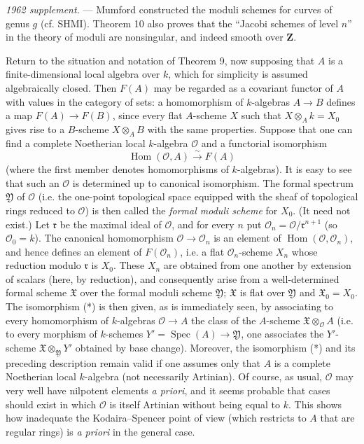 \emph{1962 supplement.} --- Mumford constructed the moduli schemes for curves
of genus $g$ (cf. SHMI). Theorem 10 also proves that the “Jacobi schemes of
level $n$” in the theory of moduli are nonsingular, and indeed smooth over
$\mathbf Z$.

Return to the situation and notation of Theorem 9, now supposing that $A$ is a
finite-dimensional local algebra over $k$, which for simplicity is assumed
algebraically closed. Then $F(A)$ may be regarded as a covariant functor of
$A$ with values in the category of sets: a homomorphism of $k$-algebras
$A\longrightarrow B$ defines a map $F(A)\longrightarrow F(B)$, since every
flat $A$-scheme $X$ such that $X\otimes_A k=X_0$ gives rise to a $B$-scheme
$X\otimes_A B$ with the same properties. Suppose that one can find a complete
Noetherian local $k$-algebra $\mathcal O$ and a functorial isomorphism
\begin{equation}
  \tag{*}
  \operatorname{Hom}(\mathcal O,A)\xrightarrow{\sim}F(A)
\end{equation}
(where the first member denotes homomorphisms of $k$-algebras). It is easy to
see that such an $\mathcal O$ is determined up to canonical isomorphism. The
formal spectrum $\mathfrak Y$ of $\mathcal O$ (i.e. the one-point topological
space equipped with the sheaf of topological rings reduced to $\mathcal O$)
is then called the \emph{formal moduli scheme} for $X_0$. (It need not exist.)
Let $\mathfrak r$ be the maximal ideal of $\mathcal O$, and for every $n$ put
$\mathcal O_n=\mathcal O/\mathfrak r^{n+1}$ (so $\mathcal O_0=k$). The
canonical homomorphism $\mathcal O\longrightarrow\mathcal O_n$ is an element
of $\operatorname{Hom}(\mathcal O,\mathcal O_n)$, and hence defines an element
of $F(\mathcal O_n)$, i.e. a flat $\mathcal O_n$-scheme $X_n$ whose reduction
modulo $\mathfrak r$ is $X_0$. These $X_n$ are obtained from one another by
extension of scalars (here, by reduction), and consequently arise from a
well-determined formal scheme $\mathfrak X$ over the formal moduli scheme
$\mathfrak Y$; $\mathfrak X$ is flat over $\mathfrak Y$ and
$\mathfrak X_0=X_0$. The isomorphism (*) is then given, as is immediately
seen, by associating to every homomorphism of $k$-algebras
$\mathcal O\longrightarrow A$ the class of the $A$-scheme
$\mathfrak X\otimes_{\mathcal O}A$ (i.e. to every morphism of $k$-schemes
$Y'=\operatorname{Spec}(A)\longrightarrow\mathfrak Y$, one associates the
$Y'$-scheme $\mathfrak X\otimes_{\mathfrak Y}Y'$ obtained by base change).
Moreover, the isomorphism (*) and its preceding description remain valid if
one assumes only that $A$ is a complete Noetherian local $k$-algebra (not
necessarily Artinian). Of course, as usual, $\mathcal O$ may very well have
nilpotent elements \textit{a priori}, and it seems probable that cases should
exist in which $\mathcal O$ is itself Artinian without being equal to $k$.
This shows how inadequate the Kodaira--Spencer point of view (which restricts
to $A$ that are regular rings) is \textit{a priori} in the general case.

